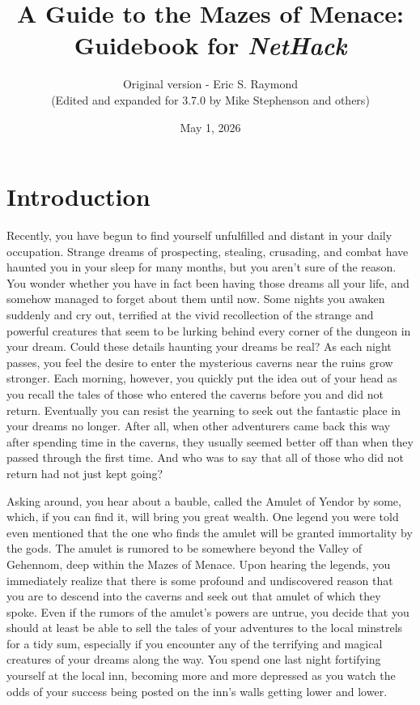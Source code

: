 \documentclass[titlepage]{article}
\begin{document}
%
%

\title{\LARGE A Guide to the Mazes of Menace:\\
\Large Guidebook for \textit{NetHack}}

\author{Original version - Eric S. Raymond\\
(Edited and expanded for 3.7.0 by Mike Stephenson and others)}
\date{May 1, 2026}

\maketitle

\section{Introduction}


Recently, you have begun to find yourself unfulfilled and distant
in your daily occupation.  Strange dreams of prospecting, stealing,
crusading, and combat have haunted you in your sleep for many months,
but you aren't sure of the reason.  You wonder whether you have in
fact been having those dreams all your life, and somehow managed to
forget about them until now.  Some nights you awaken suddenly
and cry out, terrified at the vivid recollection of the strange and
powerful creatures that seem to be lurking behind every corner of the
dungeon in your dream.  Could these details haunting your dreams be real?
As each night passes, you feel the desire to enter the mysterious caverns
near the ruins grow stronger.  Each morning, however, you quickly put
the idea out of your head as you recall the tales of those who entered
the caverns before you and did not return.  Eventually you can resist
the yearning to seek out the fantastic place in your dreams no longer.
After all, when other adventurers came back this way after spending time
in the caverns, they usually seemed better off than when they passed
through the first time.  And who was to say that all of those who did
not return had not just kept going?

Asking around, you hear about a bauble, called the Amulet of Yendor by some,
which, if you can find it, will bring you great wealth.  One legend you were
told even mentioned that the one who finds the amulet will be granted
immortality by the gods.  The amulet is rumored to be somewhere beyond the
Valley of Gehennom, deep within the Mazes of Menace.  Upon hearing the
legends, you immediately realize that there is some profound and
undiscovered reason that you are to descend into the caverns and seek
out that amulet of which they spoke.  Even if the rumors of the amulet's
powers are untrue, you decide that you should at least be able to sell the
tales of your adventures to the local minstrels for a tidy sum, especially
if you encounter any of the terrifying and magical creatures of
your dreams along the way.  You spend one last night fortifying yourself
at the local inn, becoming more and more depressed as you watch the odds
of your success being posted on the inn's walls getting lower and lower.
\end{document}
